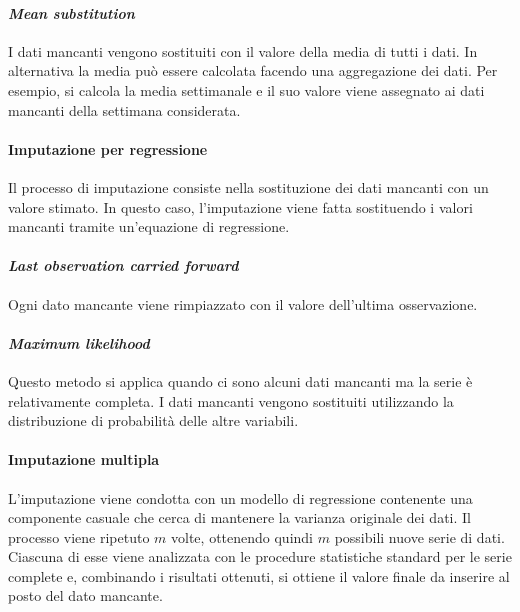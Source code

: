 \paragraph*{\textit{Mean substitution}}
I dati mancanti vengono sostituiti con il valore della media di tutti i dati. In alternativa la media può essere calcolata facendo una aggregazione dei dati. Per esempio, si calcola la media settimanale e il suo valore viene assegnato ai dati mancanti della settimana considerata.

\paragraph*{Imputazione per regressione}
Il processo di imputazione consiste nella sostituzione dei dati mancanti con un valore stimato. In questo caso, l'imputazione viene fatta sostituendo i valori mancanti tramite un'equazione di regressione.

\paragraph*{\textit{Last observation carried forward}}
Ogni dato mancante viene rimpiazzato con il valore dell'ultima osservazione.

\paragraph*{\textit{Maximum likelihood}}
Questo metodo si applica quando ci sono alcuni dati mancanti ma la serie è relativamente completa. I dati mancanti vengono sostituiti utilizzando la distribuzione di probabilità delle altre variabili.

\paragraph*{Imputazione multipla}
L'imputazione viene condotta con un modello di regressione contenente una componente casuale che cerca di mantenere la varianza originale dei dati. Il processo viene ripetuto $m$ volte, ottenendo quindi $m$ possibili nuove serie di dati. Ciascuna di esse viene analizzata con le procedure statistiche standard per le serie complete e, combinando i risultati ottenuti, si ottiene il valore finale da inserire al posto del dato mancante.

